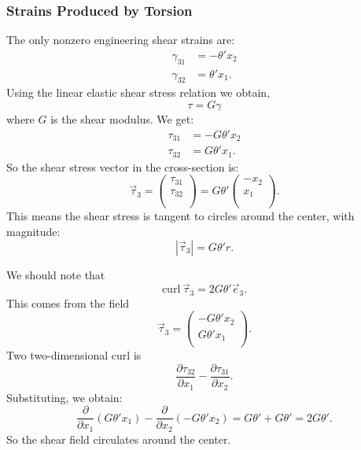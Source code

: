 \subsubsection{Strains Produced by Torsion}
The only nonzero engineering shear strains are:
\begin{align*}
  \gamma_{31} &= - \theta' x_2 \\
  \gamma_{32} &= \theta' x_1
.\end{align*}
Using the linear elastic shear stress relation we obtain,
\begin{equation*}
  \tau = G \gamma
\end{equation*}
where $G$ is the shear modulus.
We get:
\begin{align*}
  \tau_{31} &= - G \theta' x_2 \\
  \tau_{32} &= G \theta' x_1
.\end{align*}
So the shear stress vector in the cross-section is:
\begin{equation*}
  \Vec{\tau}_3 = \begin{pmatrix}
    \tau_{31}\\
  \tau_{32}\\
  \\
  \end{pmatrix} = G \theta' \begin{pmatrix}
    -x_2\\
  x_1\\
  \\
  \end{pmatrix}
.\end{equation*}
This means the shear stress is tangent to circles around the center, with magnitude:
\begin{equation*}
  \left| \Vec{\tau}_3 \right| = G \theta' r
.\end{equation*}

We should note that
\begin{equation*}
  \mathrm{curl} \,  \Vec{\tau}_3 = 2 G \theta' \Vec{e}_3
.\end{equation*}
This comes from the field
\begin{equation*}
  \Vec{\tau}_3 = \begin{pmatrix}
    - G \theta' x_2\\
  G \theta' x_1\\
  \end{pmatrix}
.\end{equation*}
Two two-dimensional curl is
\begin{equation*}
  \frac{\partial \tau_{32}}{\partial x_1}  - \frac{\partial \tau_{31}}{\partial x_2} 
.\end{equation*}
Substituting, we obtain:
\begin{equation*}
  \frac{\partial }{\partial x_1} \left( G \theta' x_1 \right) - \frac{\partial }{\partial x_2} \left( - G \theta' x_2 \right) = G \theta' + G \theta' = 2G\theta'
.\end{equation*}
So the shear field circulates around the center.

